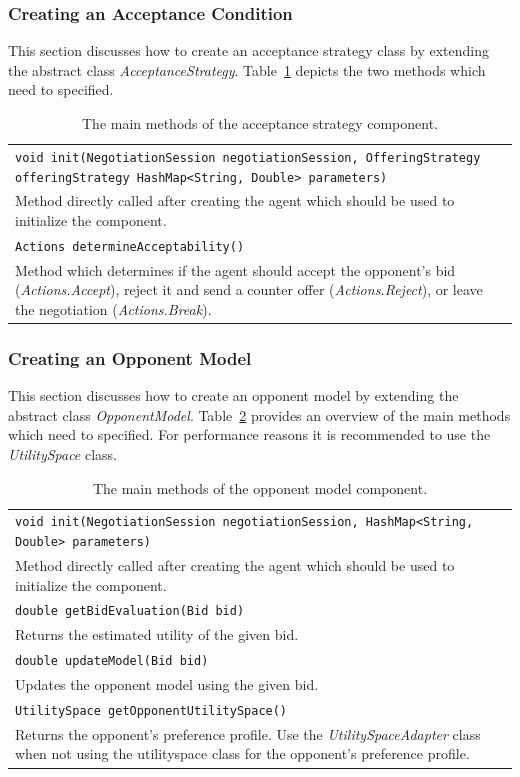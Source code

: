\documentclass[]{article}
\begin{document}
\subsubsection{Creating an Acceptance Condition}
This section discusses how to create an acceptance strategy class by extending the abstract class \textit{AcceptanceStrategy}. Table~\ref{tab:BOAas} depicts the two methods which need to specified.

\begin{table}[h]
\begin{tabular}{m{}}
\hline
\texttt{void init(NegotiationSession negotiationSession, OfferingStrategy offeringStrategy
						HashMap<String, Double> parameters)}\\
Method directly called after creating the agent which should be used to initialize the component.\\
\hline
\texttt{Actions determineAcceptability()}\\
Method which determines if the agent should accept the opponent's bid (\textit{Actions.Accept}), reject it and send a counter offer (\textit{Actions.Reject}), or leave the negotiation (\textit{Actions.Break}).\\
\hline
\end{tabular}
\caption{The main methods of the acceptance strategy component.}
\label{tab:BOAas}
\end{table}

\subsubsection{Creating an Opponent Model}
This section discusses how to create an opponent model by extending the abstract class \textit{OpponentModel}. Table~\ref{tab:BOAom} provides an overview of the main methods which need to specified. For performance reasons it is recommended to use the \textit{UtilitySpace} class.

\begin{table}[h]
\begin{tabular}{m{}}
\hline
\texttt{void init(NegotiationSession negotiationSession, HashMap<String, Double> parameters)}\\
Method directly called after creating the agent which should be used to initialize the component.\\
\hline
\texttt{double getBidEvaluation(Bid bid)}\\
Returns the estimated utility of the given bid.\\
\hline
\texttt{double updateModel(Bid bid)}\\
Updates the opponent model using the given bid.\\
\hline
\texttt{UtilitySpace getOpponentUtilitySpace()}\\
Returns the opponent's preference profile. Use the \textit{UtilitySpaceAdapter} class when not using the utilityspace class for the opponent's preference profile.\\
\hline
\end{tabular}
\caption{The main methods of the opponent model component.}
\label{tab:BOAom}
\end{table}
\end{document}
